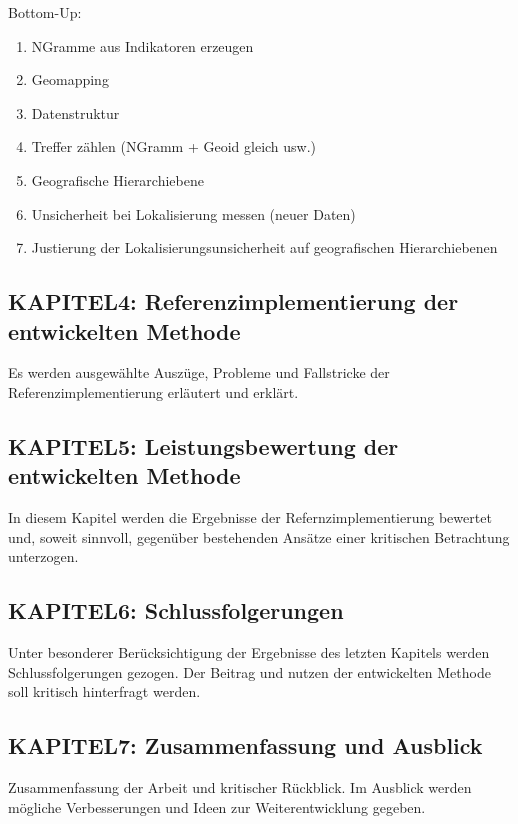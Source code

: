 			Bottom-Up:

		\begin{enumerate}
			\item NGramme aus Indikatoren erzeugen
			\item Geomapping
			\item Datenstruktur
			\item Treffer zählen (NGramm + Geoid gleich usw.)
			\item Geografische Hierarchiebene
			\item Unsicherheit bei Lokalisierung messen (neuer Daten) 
			\item Justierung der Lokalisierungsunsicherheit auf geografischen Hierarchiebenen
		\end{enumerate}

		\subsection*{KAPITEL4: Referenzimplementierung der entwickelten Methode}
			Es werden ausgewählte Auszüge, Probleme und Fallstricke der Referenzimplementierung erläutert und erklärt. 


		\subsection*{KAPITEL5: Leistungsbewertung der entwickelten Methode}
			In diesem Kapitel werden die Ergebnisse der Refernzimplementierung bewertet und, soweit sinnvoll, gegenüber bestehenden Ansätze einer kritischen Betrachtung unterzogen. 


		\subsection*{KAPITEL6: Schlussfolgerungen}
			Unter besonderer Berücksichtigung der Ergebnisse des letzten Kapitels werden Schlussfolgerungen gezogen. 
			Der Beitrag und nutzen der entwickelten Methode soll kritisch hinterfragt werden.

		\subsection*{KAPITEL7: Zusammenfassung und Ausblick}
			Zusammenfassung der Arbeit und kritischer Rückblick. Im Ausblick werden mögliche Verbesserungen und Ideen zur Weiterentwicklung gegeben.  